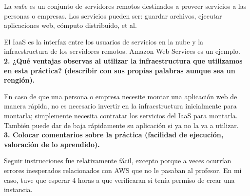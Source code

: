 \documentclass{article}
\begin{document}
La \textit{nube} es un conjunto de servidores remotos destinados a proveer servicios a las personas o empresas. Los servicios pueden ser: guardar archivos, ejecutar aplicaciones web, cómputo distribuido, et al.

El IaaS es la interfaz entre los usuarios de servicios en la nube y la infraestructura de los servidores remotos. Amazon Web Services es un ejemplo.\\

\textbf{2. ¿Qué ventajas observas al utilizar la infraestructura que utilizamos en esta práctica? (describir con sus propias palabras aunque sea un renglón).}

En caso de que una persona o empresa necesite montar una aplicación web de manera rápida, no es necesario invertir en la infraestructura inicialmente para montarla; simplemente necesita contratar los servicios del IaaS para montarla. También puede dar de baja rápidamente su aplicación si ya no la va a utilizar.\\

\textbf{3. Colocar comentarios sobre la práctica (facilidad de ejecución, valoración de lo aprendido).}

Seguir instrucciones fue relativamente fácil, excepto porque a veces ocurrían errores inesperados relacionados con AWS que no le pasaban al profesor. En mi caso, tuve que esperar 4 horas a que verificaran si tenía permiso de crear una instancia.
\end{document}
